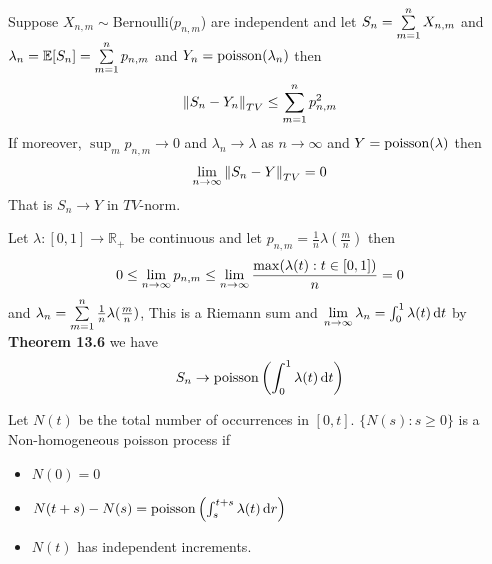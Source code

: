 \documentclass[12pt,a4paper]{article}
\begin{document}
\newpage

\begin{thm}[]
    Suppose $X_{n,m}\sim $Bernoulli($p_{n,m}$) are independent and let 
    $S_n = \sum\limits_{m=1}^{n}X_{n,m}$ and $\lambda_n = \mathbb{E}[S_n] = \sum\limits_{m=1}^{n}p_{n,m}$ and $Y_n = \mathrm{poisson}(\lambda_n)$ then
    \begin{align*}
        \norm{S_n - Y_n}_{TV} \leq \sum\limits_{m=1}^{n}p^2_{n,m}
    \end{align*}
    If moreover, $\sup_{m}p_{n,m} \rightarrow 0$ and $\lambda_n\to \lambda$ as $n\to \infty$ and $Y = \mathrm{poisson}(\lambda)$ then 
    \begin{align*}
        \lim\limits_{n \rightarrow \infty}\norm{S_n - Y}_{TV} = 0
    \end{align*}
    That is $S_n \to Y$ in $TV$-norm.
\end{thm}

\begin{example}
    Let $\lambda: [0,1] \to \mathbb{R}_{+}$ be continuous and let $p_{n,m} = \frac{1}{n}\lambda(\frac{m}{n})$ then 
    \begin{align*}
        0\leq \lim\limits_{n \rightarrow \infty}p_{n,m} \leq \lim\limits_{n \rightarrow \infty}\frac{\max(\lambda(t) : t\in [0,1])}{n} = 0
    \end{align*}
    and $\lambda_n = \sum\limits_{m=1}^{n}\frac{1}{n}\lambda(\frac{m}{n})$, This is a Riemann sum and $\lim\limits_{n \rightarrow \infty}\lambda_n = \int_0^1 \lambda(t)\dd{t}$ by \textbf{Theorem 13.6} we have 
    \begin{align*}
        S_n \to \mathrm{poisson}\left(\int_0^1\lambda(t)\dd{t}\right)
    \end{align*}
\end{example}
\begin{defn}
    Let $N(t)$ be the total number of occurrences in $[0,t]$.
    $\{N(s) : s\geq 0\}$ is a Non-homogeneous poisson process if
    \begin{itemize}[(i)]
        \item $N(0) = 0$
        \item $N(t+s) - N(s) = \mathrm{poisson}\left(\int_{s}^{t+s}\lambda(t)\dd{r} \right)$
        \item $N(t)$ has independent increments. 
    \end{itemize}
\end{defn}
\newpage
\end{document}
